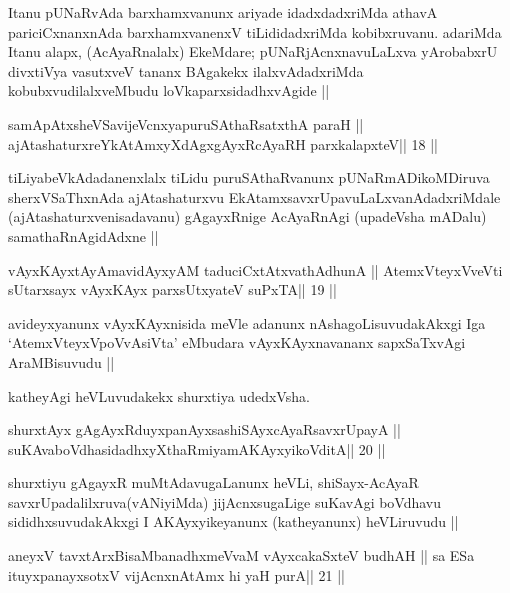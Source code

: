 \begin{artha}
Itanu pUNaRvAda barxhamxvanunx ariyade idadxdadxriMda athavA pariciCxnanxnAda barxhamxvanenxV tiLididadxriMda kobibxruvanu. adariMda Itanu alapx, (AcAyaRnalalx) EkeMdare; pUNaRjAcnxnavuLaLxva yArobabxrU divxtiVya vasutxveV tananx BAgakekx ilalxvAdadxriMda kobubxvudilalxveMbudu loVkaparxsidadhxvAgide ||
\end{artha}

\begin{shl}
samApAtxsheVSavijeVcnxyapuruSAthaRsatxthA paraH ||
ajAtashaturxreYkAtAmxyXdAgxgAyxRcAyaRH parxkalapxteV\hfill || 18 ||
\end{shl}

\begin{artha}
tiLiyabeVkAdadanenxlalx tiLidu puruSAthaRvanunx pUNaRmADikoMDiruva sherxVSaThxnAda ajAtashaturxvu EkAtamxsavxrUpavuLaLxvanAdadxriMdale (ajAtashaturxvenisadavanu) gAgayxRnige AcAyaRnAgi (upadeVsha mADalu) samathaRnAgidAdxne ||
\end{artha}

\begin{shl}
vAyxKAyxtAyAmavidAyxyAM taduciCxtAtxvathAdhunA ||
AtemxVteyxVveVti sUtarxsayx vAyxKAyx parxsUtxyateV suPxTA\hfill || 19 ||
\end{shl}

\begin{artha}
avideyxyanunx vAyxKAyxnisida meVle adanunx nAshagoLisuvudakAkxgi Iga `AtemxVteyxVpoVvAsiVta' eMbudara vAyxKAyxnavananx sapxSaTxvAgi AraMBisuvudu ||
\end{artha}

\begin{artha}
katheyAgi heVLuvudakekx shurxtiya udedxVsha.
\end{artha} 

\begin{shl}
shurxtAyx gAgAyxRduyxpanAyxsashiSAyxcAyaRsavxrUpayA ||
suKAvaboVdhasidadhxyXthaRmiyamAKAyxyikoVditA\hfill || 20 ||
\end{shl}

\begin{artha}
shurxtiyu gAgayxR muMtAdavugaLanunx heVLi, shiSayx-AcAyaR savxrUpadalilxruva(vANiyiMda) jijAcnxsugaLige suKavAgi boVdhavu sididhxsuvudakAkxgi I AKAyxyikeyanunx (katheyanunx) heVLiruvudu ||
\end{artha}


\begin{shl}
aneyxV tavxtArxBisaMbanadhxmeVvaM vAyxcakaSxteV budhAH ||
sa ESa ituyxpanayxsotxV vijAcnxnAtAmx hi yaH purA\hfill || 21 ||
\end{shl}

